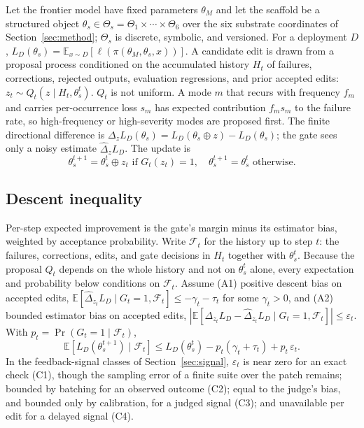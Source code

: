 \documentclass[
  11pt,
]{article}
\begin{document}
Let the frontier model have fixed parameters \(\theta_M\) and let the scaffold be a structured object \(\theta_s \in \Theta_s = \Theta_1 \times \cdots \times \Theta_6\) over the six substrate coordinates of Section~\ref{sec:method}; \(\Theta_s\) is discrete, symbolic, and versioned. For a deployment \(D\), \(L_D(\theta_s) = \mathbb{E}_{x \sim D}[\ell(\pi(\theta_M, \theta_s, x))]\). A candidate edit is drawn from a proposal process conditioned on the accumulated history \(H_t\) of failures, corrections, rejected outputs, evaluation regressions, and prior accepted edits: \(z_t \sim Q_t(z \mid H_t, \theta_s^t)\). \(Q_t\) is not uniform. A mode \(m\) that recurs with frequency \(f_m\) and carries per-occurrence loss \(s_m\) has expected contribution \(f_m s_m\) to the failure rate, so high-frequency or high-severity modes are proposed first. The finite directional difference is \(\Delta_z L_D(\theta_s) = L_D(\theta_s \oplus z) - L_D(\theta_s)\); the gate sees only a noisy estimate \(\widehat{\Delta}_z L_D\). The update is \[\theta_s^{t+1} = \theta_s^t \oplus z_t \text{ if } G_t(z_t) = 1, \quad \theta_s^{t+1} = \theta_s^t \text{ otherwise.}\]

\subsection{Descent inequality}\label{descent-inequality}

Per-step expected improvement is the gate's margin minus its estimator bias, weighted by acceptance probability. Write \(\mathcal{F}_t\) for the history up to step \(t\): the failures, corrections, edits, and gate decisions in \(H_t\) together with \(\theta_s^t\). Because the proposal \(Q_t\) depends on the whole history and not on \(\theta_s^t\) alone, every expectation and probability below conditions on \(\mathcal{F}_t\). Assume (A1) positive descent bias on accepted edits, \(\mathbb{E}[\widehat{\Delta}_{z_t} L_D \mid G_t = 1, \mathcal{F}_t] \le -\gamma_t - \tau_t\) for some \(\gamma_t > 0\), and (A2) bounded estimator bias on accepted edits, \(|\mathbb{E}[\Delta_{z_t} L_D - \widehat{\Delta}_{z_t} L_D \mid G_t = 1, \mathcal{F}_t]| \le \varepsilon_t\). With \(p_t = \Pr(G_t = 1 \mid \mathcal{F}_t)\), \[\mathbb{E}[L_D(\theta_s^{t+1}) \mid \mathcal{F}_t] \le L_D(\theta_s^t) - p_t(\gamma_t + \tau_t) + p_t\,\varepsilon_t.\] In the feedback-signal classes of Section~\ref{sec:signal}, \(\varepsilon_t\) is near zero for an exact check (C1), though the sampling error of a finite suite over the patch remains; bounded by batching for an observed outcome (C2); equal to the judge's bias, and bounded only by calibration, for a judged signal (C3); and unavailable per edit for a delayed signal (C4).
\end{document}
